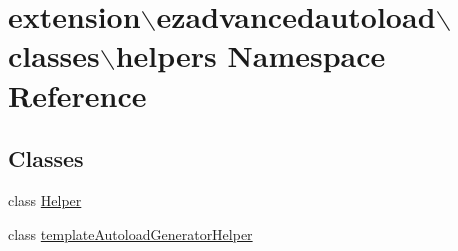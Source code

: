 \hypertarget{namespaceextension_1_1ezadvancedautoload_1_1classes_1_1helpers}{\section{extension$\backslash$ezadvancedautoload$\backslash$classes$\backslash$helpers \-Namespace \-Reference}
\label{namespaceextension_1_1ezadvancedautoload_1_1classes_1_1helpers}
}
\subsection*{\-Classes}
\begin{DoxyCompactItemize}
\item 
class \hyperlink{classextension_1_1ezadvancedautoload_1_1classes_1_1helpers_1_1_helper}{\-Helper}
\item 
class \hyperlink{classextension_1_1ezadvancedautoload_1_1classes_1_1helpers_1_1template_autoload_generator_helper}{template\-Autoload\-Generator\-Helper}
\end{DoxyCompactItemize}
